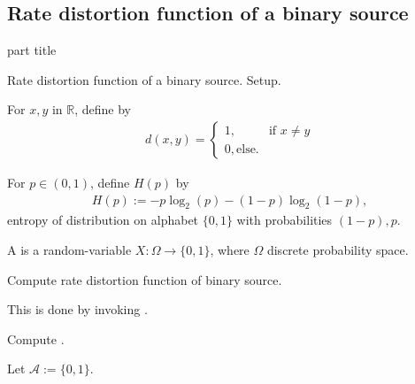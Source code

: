 \subsection{Rate distortion function of a binary source} 
\begin{frame}
 \vspace{12.0ex}
\begin{center}
\begin{beamercolorbox}[sep=12pt,center]{part title}
\insertsubsection\par
\end{beamercolorbox}
\end{center}
\end{frame}
\begin{frame}{Rate distortion function of a binary source. Setup.}
\bit
\item For $x,y$ in $\mathbb{R}$, define  by
\begin{align*}
d(x,y)=\begin{cases} 1, & \text{if $x\neq y$}\\ 0, \text{else.}\end{cases}
\end{align*}
\item For $p\in (0,1)$, define  $H(p)$ by
\begin{align*}
H(p):=-p\log_2(p)-(1-p)\log_2(1-p),
\end{align*}
entropy of distribution on alphabet $\{0,1\}$ with probabilities $(1-p), p$.
\item A  is a random-variable $X: \Omega\to\{0, 1\}$, where $\Omega$ discrete probability space.

\item {} Compute rate distortion function of binary source. 
\item This is done by invoking .
\item [\iarrow]  Compute .  
\item Let $\mathcal{A}:=\{0,1\}$. 
\eit
\end{frame}


